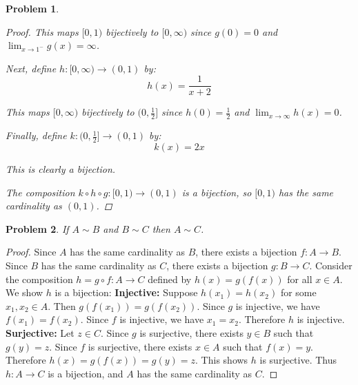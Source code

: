 \documentclass[12pt]{article}
\newtheorem{problem}{Problem}
\begin{document}
\begin{problem}
\begin{enumerate}
\begin{proof}
This maps $[0,1)$ bijectively to $[0,\infty)$ since $g(0) = 0$ and $\lim_{x \to 1^-} g(x) = \infty$.

Next, define $h: [0,\infty) \to (0,1)$ by:
$$h(x) = \frac{1}{x+2}$$

This maps $[0,\infty)$ bijectively to $(0,\frac{1}{2}]$ since $h(0) = \frac{1}{2}$ and $\lim_{x \to \infty} h(x) = 0$.

Finally, define $k: (0,\frac{1}{2}] \to (0,1)$ by:
$$k(x) = 2x$$

This is clearly a bijection.

The composition $k \circ h \circ g: [0,1) \to (0,1)$ is a bijection, so $[0,1)$ has the same cardinality as $(0,1)$.
\end{proof}

\end{enumerate}
\end{problem}


\begin{problem} %
If $A\sim B$ and $B\sim C$ then $A\sim C$.
\end{problem}


\begin{proof}
Since $A$ has the same cardinality as $B$, there exists a bijection $f: A \to B$.
Since $B$ has the same cardinality as $C$, there exists a bijection $g: B \to C$.
Consider the composition $h = g \circ f: A \to C$ defined by $h(x) = g(f(x))$ for all $x \in A$.
We show $h$ is a bijection:
\newline
\textbf{Injective:} Suppose $h(x_1) = h(x_2)$ for some $x_1, x_2 \in A$. Then $g(f(x_1)) = g(f(x_2))$. Since $g$ is injective, we have $f(x_1) = f(x_2)$. Since $f$ is injective, we have $x_1 = x_2$. Therefore $h$ is injective.
\newline
\textbf{Surjective:} Let $z \in C$. Since $g$ is surjective, there exists $y \in B$ such that $g(y) = z$. Since $f$ is surjective, there exists $x \in A$ such that $f(x) = y$. Therefore $h(x) = g(f(x)) = g(y) = z$. This shows $h$ is surjective.
\newline\newline
Thus $h: A \to C$ is a bijection, and $A$ has the same cardinality as $C$.
\end{proof}
\end{document}
